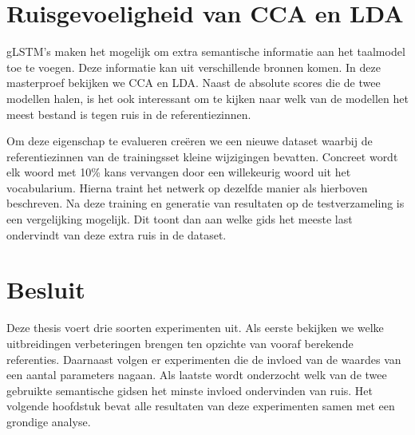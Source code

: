 \section{Ruisgevoeligheid van CCA en LDA} %
\label{sec:ruisgevoeligheid_van_cca_en_lda_exp}
gLSTM's maken het mogelijk om extra semantische informatie aan het taalmodel toe te voegen. Deze informatie kan uit verschillende bronnen komen. In deze masterproef bekijken we CCA en LDA. Naast de absolute scores die de twee modellen halen, is het ook interessant om te kijken naar welk van de modellen het meest bestand is tegen ruis in de referentiezinnen.

Om deze eigenschap te evalueren cre\"eren we een nieuwe dataset waarbij de referentiezinnen van de trainingsset kleine wijzigingen bevatten.
Concreet wordt elk woord met 10\% kans vervangen door een willekeurig woord uit het vocabularium. Hierna traint het netwerk op dezelfde manier als hierboven beschreven. Na deze training en generatie van resultaten op de testverzameling is een vergelijking mogelijk. Dit toont dan aan welke gids het meeste last ondervindt van deze extra ruis in de dataset.

\section{Besluit}
Deze thesis voert drie soorten experimenten uit. Als eerste bekijken we welke uitbreidingen verbeteringen brengen ten opzichte van vooraf berekende referenties. Daarnaast volgen er experimenten die de invloed van de waardes van een aantal parameters nagaan. Als laatste wordt onderzocht welk van de twee gebruikte semantische gidsen het minste invloed ondervinden van ruis.
Het volgende hoofdstuk bevat alle resultaten van deze experimenten samen met een grondige analyse.

